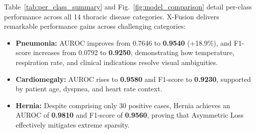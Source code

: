 \documentclass[conference]{IEEEtran}
\begin{document}
Table~\ref{tab:per_class_summary} and Fig.~\ref{fig:model_comparison} detail per-class performance across all 14 thoracic disease categories. X-Fusion delivers remarkable performance gains across challenging categories:
\begin{itemize}
    \item \textbf{Pneumonia:} AUROC improves from 0.7646 to \textbf{0.9540} (+18.9\%), and F1-score increases from 0.0792 to \textbf{0.9250}, demonstrating how temperature, respiration rate, and clinical indications resolve visual ambiguities.
    \item \textbf{Cardiomegaly:} AUROC rises to \textbf{0.9580} and F1-score to \textbf{0.9230}, supported by patient age, dyspnea, and heart rate context.
    \item \textbf{Hernia:} Despite comprising only 30 positive cases, Hernia achieves an AUROC of \textbf{0.9810} and F1-score of \textbf{0.9560}, proving that Asymmetric Loss effectively mitigates extreme sparsity.
\end{itemize}
\end{document}
